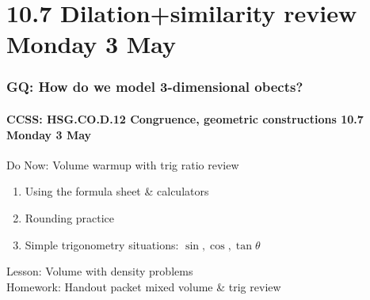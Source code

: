 \documentclass{beamer}
\begin{document}
\section{10.7 Dilation+similarity review Monday 3 May}
  \frame
  {
    \frametitle{GQ: How do we model 3-dimensional obects?}
    \framesubtitle{CCSS: HSG.CO.D.12 Congruence, geometric constructions \hfill \alert{10.7 Monday 3 May}}
    \begin{block}{Do Now: Volume warmup with trig ratio review}
      \begin{enumerate}
        \item Using the formula sheet \& calculators
        \item Rounding practice
        \item Simple trigonometry situations: $\sin, \cos, \tan \theta$
    \end{enumerate}
    \end{block}
    Lesson: Volume with density problems\\[1cm]
    Homework: Handout packet mixed volume \& trig review
  }
\end{document}
